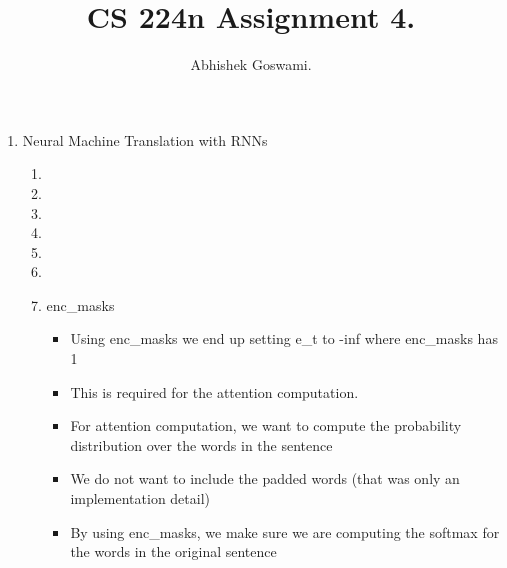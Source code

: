 \documentclass[]{article}
\begin{document}
\title{CS 224n Assignment 4.}
\author{Abhishek Goswami.}
\maketitle

\begin{enumerate}
	\item Neural Machine Translation with RNNs
	\begin{enumerate}
		\item
		\item
		\item
		\item
		\item
		\item
		\item  
		enc\_masks
		\begin{itemize}
			\item Using enc\_masks we end up setting e\_t to -inf where enc\_masks has 1
			\item This is required for the attention computation.
			\item For attention computation, we want to compute the probability distribution over the words in the sentence
			\item We do not want to include the padded words (that was only an implementation detail)
			\item By using enc\_masks, we make sure we are computing the softmax for the words in the original sentence
		\end{itemize}
		

\end{enumerate}
\end{enumerate}
\end{document}
